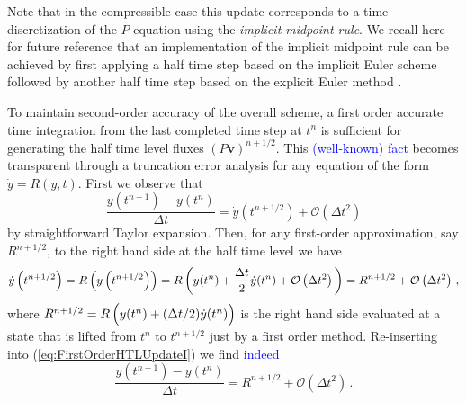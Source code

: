 \documentclass{ametsoc}
\theoremstyle{definition}
\newcommand{\klein}[1]{\textcolor{blue}{#1}}
\newcommand{\eq}[1]{(\ref{#1})}
\newcommand{\vect}[1]{{\mathbf{#1}}}
\newcommand{\vv}{\vect{v}}
\newcommand{\half}{1/2}
\newcommand{\dt}{\Delta t}
\newcommand{\bigoh}[1]{\mathcal{O}\left(#1\right)}
\begin{document}
Note that in the compressible case this update corresponds to a time 
discretization of the $P$-equation
using the \emph{implicit midpoint rule}. We recall here for future reference that
an implementation of the implicit midpoint rule can be achieved by first applying
a half time step based on the implicit Euler scheme followed by another half time
step based on the explicit Euler method \citep{HairerEtAl2006}.

To maintain second-order accuracy of the overall scheme, a first order accurate 
time integration from the last completed time step at $t^n$ is sufficient for 
generating the half time level fluxes $(P\vv)^{n+\half}$. This \klein{(well-known)
fact} becomes transparent through a truncation error analysis for any equation of 
the form $\dot y = R(y,t)$. First we observe that
%
\begin{equation}\label{eq:FirstOrderHTLUpdateI}
\frac{y(t^{n+1})-y(t^n)}{\dt} = \dot y\left(t^{n+\half}\right) + \bigoh{\dt^2}
\end{equation}
%
by straightforward Taylor expansion. Then, for any first-order approximation, 
say $R^{n+\half}$, to the right hand side at the half time level we have  
%
\begin{equation}\label{eq:FirstOrderHTLUpdateII}
\dot y\left(t^{n+\half}\right) 
= R\left(y\left(t^{n+\half}\right)\right) 
= R\left(y(t^n) + \frac{\Delta t}{2} \dot y(t^n) + \bigoh{\Delta t^2}\rule{0pt}{12pt}\right)
= R^{n+\half} + \bigoh{\dt^2}\,,
\end{equation}
%
where $R^{n+\half} = R\left(y(t^n) + (\Delta t/2) \dot y(t^n)\rule{0pt}{10pt}\right)$ is the right hand side evaluated at a state that is lifted from $t^n$ to $t^{n+\half}$ just by a first order method. Re-inserting into \eq{eq:FirstOrderHTLUpdateI} we find \klein{indeed}
%
\begin{equation}
\frac{y(t^{n+1})-y(t^n)}{\dt} = R^{n+\half} + \bigoh{\dt^2}\, .
\end{equation}
%
\end{document}
